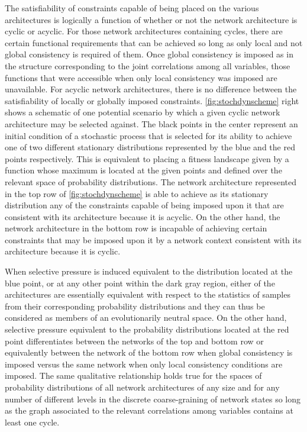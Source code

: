 The satisfiability of constraints capable of being placed on the various architectures is logically a function of whether or not the network architecture is cyclic or acyclic. For those network architectures containing cycles, there are certain functional requirements that can be achieved so long as only local and not global consistency is required of them. Once global consistency is imposed as in the structure corresponding to the joint correlations among all variables, those functions that were accessible when only local consistency was imposed are unavailable. For acyclic network architectures, there is no difference between the satisfiability of locally or globally imposed constraints. \ref{fig:stochdynscheme} right shows a schematic of one potential scenario by which a given cyclic network architecture may be selected against. The black points in the center represent an initial condition of a stochastic process that is selected for its ability to achieve one of two different stationary distributions represented by the blue and the red points respectively. This is equivalent to placing a fitness landscape given by a function whose maximum is located at the given points and defined over the relevant space of probability distributions. The network architecture represented in the top row of \ref{fig:stochdynscheme} is able to achieve as its stationary distribution any of the constraints capable of being imposed upon it that are consistent with its architecture because it is acyclic. On the other hand, the network architecture in the bottom row is incapable of achieving certain constraints that may be imposed upon it by a network context consistent with its architecture because it is cyclic.

When selective pressure is induced equivalent to the distribution located at the blue point, or at any other point within the dark gray region, either of the architectures are essentially equivalent with respect to the statistics of samples from their corresponding probability distributions and they can thus be considered as members of an evolutionarily neutral space. On the other hand, selective pressure equivalent to the probability distributions located at the red point differentiates between the networks of the top and bottom row or equivalently between the network of the bottom row when global consistency is imposed versus the same network when only local consistency conditions are imposed. The same qualitative relationship holds true for the spaces of probability distributions of all network architectures of any size and for any number of different levels in the discrete coarse-graining of network states so long as the graph associated to the relevant correlations among variables contains at least one cycle.

